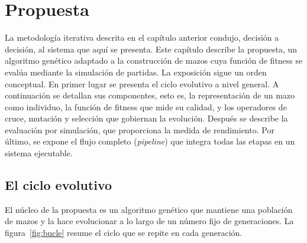 
\chapter{Propuesta}
\label{sec:arquitectura}

La metodología iterativa descrita en el capítulo anterior condujo, decisión a decisión, al sistema que aquí se presenta. Este capítulo describe la propuesta, un algoritmo genético adaptado a la construcción de mazos cuya función de fitness se evalúa mediante la simulación de partidas. La exposición sigue un orden conceptual. En primer lugar se presenta el ciclo evolutivo a nivel general. A continuación se detallan sus componentes, esto es, la representación de un mazo como individuo, la función de fitness que mide su calidad, y los operadores de cruce, mutación y selección que gobiernan la evolución. Después se describe la evaluación por simulación, que proporciona la medida de rendimiento. Por último, se expone el flujo completo (\emph{pipeline}) que integra todas las etapas en un sistema ejecutable.

\section{El ciclo evolutivo}
\label{sec:ciclo}

El núcleo de la propuesta es un algoritmo genético que mantiene una población de mazos y la hace evolucionar a lo largo de un número fijo de generaciones. La figura~\ref{fig:bucle} resume el ciclo que se repite en cada generación.

